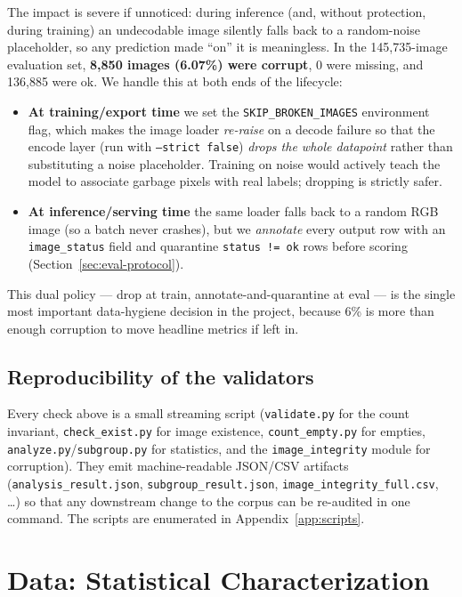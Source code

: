 \documentclass[11pt,a4paper]{article}
\begin{document}
The impact is severe if unnoticed: during inference (and, without protection, during training) an undecodable image silently falls back to a random-noise placeholder, so any prediction made ``on'' it is meaningless. In the 145{,}735-image evaluation set, \textbf{8{,}850 images (6.07\%) were corrupt}, 0 were missing, and 136{,}885 were ok. We handle this at both ends of the lifecycle:

\begin{itemize}[leftmargin=1.4em]
  \item \textbf{At training/export time} we set the \texttt{SKIP\_BROKEN\_IMAGES} environment flag, which makes the image loader \emph{re-raise} on a decode failure so that the encode layer (run with \texttt{--strict false}) \emph{drops the whole datapoint} rather than substituting a noise placeholder. Training on noise would actively teach the model to associate garbage pixels with real labels; dropping is strictly safer.
  \item \textbf{At inference/serving time} the same loader falls back to a random RGB image (so a batch never crashes), but we \emph{annotate} every output row with an \texttt{image\_status} field and quarantine \texttt{status != ok} rows before scoring (Section~\ref{sec:eval-protocol}).
\end{itemize}

This dual policy --- drop at train, annotate-and-quarantine at eval --- is the single most important data-hygiene decision in the project, because 6\% is more than enough corruption to move headline metrics if left in.

\subsection{Reproducibility of the validators}
Every check above is a small streaming script (\texttt{validate.py} for the count invariant, \texttt{check\_exist.py} for image existence, \texttt{count\_empty.py} for empties, \texttt{analyze.py}/\texttt{subgroup.py} for statistics, and the \texttt{image\_integrity} module for corruption). They emit machine-readable JSON/CSV artifacts (\texttt{analysis\_result.json}, \texttt{subgroup\_result.json}, \texttt{image\_integrity\_full.csv}, \dots) so that any downstream change to the corpus can be re-audited in one command. The scripts are enumerated in Appendix~\ref{app:scripts}.

\section{Data: Statistical Characterization}
\label{sec:stats}
\end{document}
